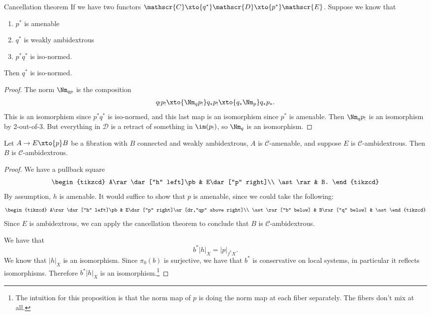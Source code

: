 \begin{customenvironment}{Cancellation theorem} If we have two functors $\mathscr{C} \xto{q^\ast} \mathscr{D} \xto{p^\ast} \mathscr{E}$. Suppose we know that
\begin{enumerate}
    \item $p^\ast$ is amenable
    \item $q^\ast$ is weakly ambidextrous
    \item $p^\ast q^\ast$ is iso-normed.
\end{enumerate}
Then $q^\ast$ is iso-normed.
\end{customenvironment}
\begin{proof} The norm $\Nm_{qp}$ is the composition
\begin{align*}
    q_! p_! \xto{\Nm_q p_!} q_\ast p_! \xto{q_\ast \Nm_p} q_\ast p_\ast.
\end{align*}
This is an isomorphism since $p^\ast q^\ast$ is iso-normed, and this last map is an isomorphism since $p^\ast$ is amenable. Then $\Nm_q p_!$ is an isomorphism by 2-out-of-3. But everything in $\mathscr{D}$ is a retract of something in $\im(p_!)$, so $\Nm_q$ is an isomorphism.
\end{proof}

\begin{proposition} Let $A \to E \xto{p} B$ be a fibration with $B$ connected and weakly ambidextrous, $A$ is $\mathscr{C}$-amenable, and suppose $E$ is $\mathscr{C}$-ambidextrous. Then $B$ is $\mathscr{C}$-ambidextrous.
\end{proposition}
\begin{proof} We have a pullback square
\[ \begin{tikzcd}
    A\rar\dar["h" left]\pb & E\dar["p" right]\\
    \ast\rar & B.
\end{tikzcd} \]
By assumption, $h$ is amenable. It would suffice to show that $p$ is amenable, since we could take the following:
\[ \begin{tikzcd}
    A\rar\dar["h" left]\pb & E\dar["p" right]\ar[dr,"qp" above right]\\
    \ast\rar["b" below] & B\rar["q" below] & \ast
\end{tikzcd} \]
Since $E$ is ambidextrous, we can apply the cancellation theorem to conclude that $B$ is $\mathscr{C}$-ambidextrous.

We have that \[b^\ast |h|_X = |p|_{f^\ast X}.\] We know that $|h|_X$ is an isomorphism. Since $\pi_0(b)$ is surjective, we have that $b^\ast$ is conservative on local systems, in particular it reflects isomorphisms. Therefore $b^\ast |h|_X$ is an isomorphism.\footnote{The intuition for this proposition is that the norm map of $p$ is doing the norm map at each fiber separately. The fibers don't mix at all.}
\end{proof}

